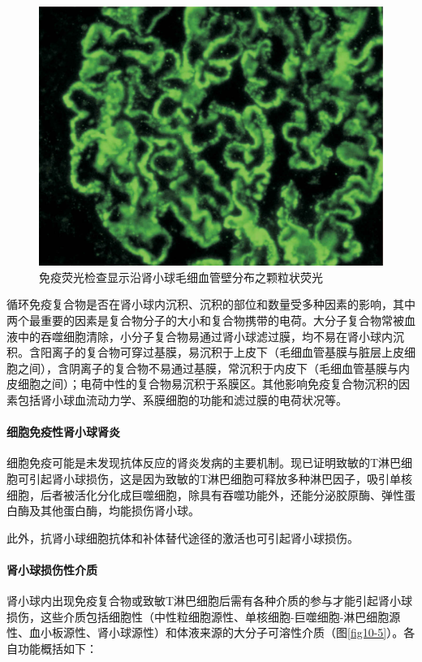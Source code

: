 \begin{figure}[!htbp]
 \centering
 \includegraphics{./images/Image00150.jpg}
 \captionsetup{justification=centering}
 \caption{免疫荧光检查显示沿肾小球毛细血管壁分布之颗粒状荧光}
 \label{fig10-4}
  \end{figure} 

循环免疫复合物是否在肾小球内沉积、沉积的部位和数量受多种因素的影响，其中两个最重要的因素是复合物分子的大小和复合物携带的电荷。大分子复合物常被血液中的吞噬细胞清除，小分子复合物易通过肾小球滤过膜，均不易在肾小球内沉积。含阳离子的复合物可穿过基膜，易沉积于上皮下（毛细血管基膜与脏层上皮细胞之间），含阴离子的复合物不易通过基膜，常沉积于内皮下（毛细血管基膜与内皮细胞之间）；电荷中性的复合物易沉积于系膜区。其他影响免疫复合物沉积的因素包括肾小球血流动力学、系膜细胞的功能和滤过膜的电荷状况等。

\paragraph{细胞免疫性肾小球肾炎}
细胞免疫可能是未发现抗体反应的肾炎发病的主要机制。现已证明致敏的T淋巴细胞可引起肾小球损伤，这是因为致敏的T淋巴细胞可释放多种淋巴因子，吸引单核细胞，后者被活化分化成巨噬细胞，除具有吞噬功能外，还能分泌胶原酶、弹性蛋白酶及其他蛋白酶，均能损伤肾小球。

此外，抗肾小球细胞抗体和补体替代途径的激活也可引起肾小球损伤。

\paragraph{肾小球损伤性介质}
肾小球内出现免疫复合物或致敏T淋巴细胞后需有各种介质的参与才能引起肾小球损伤，这些介质包括细胞性（中性粒细胞源性、单核细胞-巨噬细胞-淋巴细胞源性、血小板源性、肾小球源性）和体液来源的大分子可溶性介质（图\ref{fig10-5}）。各自功能概括如下：

